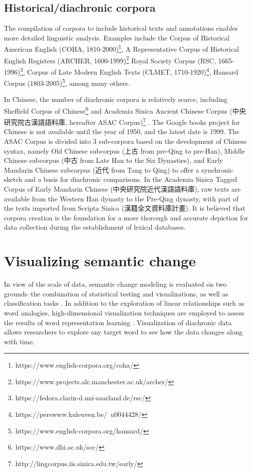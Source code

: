 \subsection{Historical/diachronic corpora}
The compilation of corpora to include historical texts and annotations enables more detailed linguistic analysis. Examples include
the Corpus of Historical American English (COHA, 1810-2000)\footnote{https://www.english-corpora.org/coha/}, 
A Representative Corpus of Historical English Registers (ARCHER, 1600-1999)\footnote{https://www.projects.alc.manchester.ac.uk/archer/}
Royal Society Corpus (RSC, 1665-1996)\footnote{https://fedora.clarin-d.uni-saarland.de/rsc/}, 
Corpus of Late Modern English Texts (CLMET, 1710-1920)\footnote{https://perswww.kuleuven.be/~u0044428/}, 
Hansard Corpus (1803-2005)\footnote{https://www.english-corpora.org/hansard/}, among many others.

In Chinese, the number of diachronic corpora is relatively scarce, including Sheffield Corpus of Chinese\footnote{https://www.dhi.ac.uk/scc/} and Academia Sinica Ancient Chinese Corpus (中央研究院古漢語語料庫, hereafter ASAC Corpus)\footnote{http://lingcorpus.iis.sinica.edu.tw/early/} \parencite{wei1997corpus}. The Google books project for Chinese is not available until the year of 1950, and the latest date is 1999. The ASAC Corpus is divided into 3 sub-corpora based on the development of Chinese syntax, namely Old Chinese subcorpus (上古 from pre-Qing to pre-Han), Middle Chinese subcorpus (中古 from Late Han to the Six Dynasties), and Early Mandarin Chinese subcorpus (近代 from Tang to Qing) to offer a synchronic sketch and a basis for diachronic comparisons. In the Academia Sinica Tagged Corpus of Early Mandarin Chinese (中央研究院近代漢語語料庫), raw texts are available from the Western Han dynasty to the Pre-Qing dynasty, with part of the texts imported from Scripta Sinica (漢籍全文資料庫計畫). It is believed that corpora creation is the foundation for a more thorough and accurate depiction for data collection during the establishment of lexical databases.



\section{Visualizing semantic change}
In view of the scale of data, semantic change modeling is evaluated on two grounds--the combination of statistical testing and visualizations, as well as classification tasks \parencite{tang2018state}. In addition to the exploration of linear relationships such as word analogies, high-dimensional visualization techniques are employed to assess the results of word representation learning \parencite{liu2017visual}. Visualization of diachronic data allows researchers to explore any target word to see how the data changes along with time.


